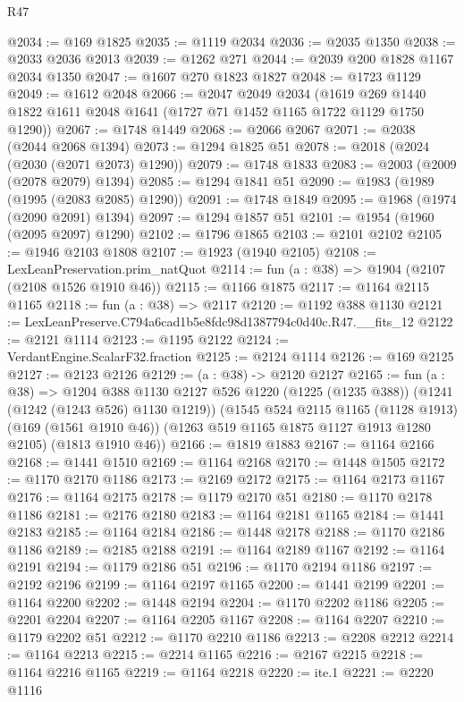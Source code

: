 \begin{lexlean}{R47}
\begin{coremodule}
@2034 := @169 @1825
@2035 := @1119 @2034
@2036 := @2035 @1350
@2038 := @2033 @2036 @2013
@2039 := @1262 @271
@2044 := @2039 @200 @1828 @1167 @2034 @1350
@2047 := @1607 @270 @1823 @1827
@2048 := @1723 @1129
@2049 := @1612 @2048
@2066 := @2047
    @2049
    @2034
    (@1619 @269 @1440 @1822 @1611 @2048 @1641 (@1727 @71 @1452 @1165 @1722 @1129 @1750 @1290))
@2067 := @1748 @1449
@2068 := @2066 @2067
@2071 := @2038 (@2044 @2068 @1394)
@2073 := @1294 @1825 @51
@2078 := @2018 (@2024 (@2030 (@2071 @2073) @1290))
@2079 := @1748 @1833
@2083 := @2003 (@2009 (@2078 @2079) @1394)
@2085 := @1294 @1841 @51
@2090 := @1983 (@1989 (@1995 (@2083 @2085) @1290))
@2091 := @1748 @1849
@2095 := @1968 (@1974 (@2090 @2091) @1394)
@2097 := @1294 @1857 @51
@2101 := @1954 (@1960 (@2095 @2097) @1290)
@2102 := @1796 @1865
@2103 := @2101 @2102
@2105 := @1946 @2103 @1808
@2107 := @1923 (@1940 @2105)
@2108 := LexLeanPreservation.prim_natQuot
@2114 := fun (a : @38) => @1904 (@2107 (@2108 @1526 @1910 @46))
@2115 := @1166 @1875
@2117 := @1164 @2115 @1165
@2118 := fun (a : @38) => @2117
@2120 := @1192 @388 @1130
@2121 := LexLeanPreserve.C794a6cad1b5e8fdc98d1387794c0d40c.R47.__fits_12
@2122 := @2121 @1114
@2123 := @1195 @2122
@2124 := VerdantEngine.ScalarF32.fraction
@2125 := @2124 @1114
@2126 := @169 @2125
@2127 := @2123 @2126
@2129 := (a : @38) -> @2120 @2127
@2165 := fun (a : @38) =>
  @1204
    @388
    @1130
    @2127
    @526
    @1220
    (@1225 (@1235 @388))
    (@1241 (@1242 (@1243 @526) @1130 @1219))
    (@1545
      @524
      @2115
      @1165
      (@1128 @1913)
      (@169 (@1561 @1910 @46))
      (@1263 @519 @1165 @1875 @1127 @1913 @1280 @2105)
      (@1813 @1910 @46))
@2166 := @1819 @1883
@2167 := @1164 @2166
@2168 := @1441 @1510
@2169 := @1164 @2168
@2170 := @1448 @1505
@2172 := @1170 @2170 @1186
@2173 := @2169 @2172
@2175 := @1164 @2173 @1167
@2176 := @1164 @2175
@2178 := @1179 @2170 @51
@2180 := @1170 @2178 @1186
@2181 := @2176 @2180
@2183 := @1164 @2181 @1165
@2184 := @1441 @2183
@2185 := @1164 @2184
@2186 := @1448 @2178
@2188 := @1170 @2186 @1186
@2189 := @2185 @2188
@2191 := @1164 @2189 @1167
@2192 := @1164 @2191
@2194 := @1179 @2186 @51
@2196 := @1170 @2194 @1186
@2197 := @2192 @2196
@2199 := @1164 @2197 @1165
@2200 := @1441 @2199
@2201 := @1164 @2200
@2202 := @1448 @2194
@2204 := @1170 @2202 @1186
@2205 := @2201 @2204
@2207 := @1164 @2205 @1167
@2208 := @1164 @2207
@2210 := @1179 @2202 @51
@2212 := @1170 @2210 @1186
@2213 := @2208 @2212
@2214 := @1164 @2213
@2215 := @2214 @1165
@2216 := @2167 @2215
@2218 := @1164 @2216 @1165
@2219 := @1164 @2218
@2220 := ite.{1}
@2221 := @2220 @1116

\end{coremodule}
\end{lexlean}
